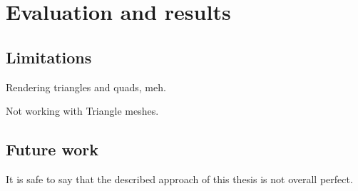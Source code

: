 \chapter{Evaluation and results}
\label{chap:results}

\section{Limitations}

Rendering triangles and quads, meh.

Not working with Triangle meshes.

\section{Future work}
It is safe to say that the described approach of this thesis is not overall perfect.

